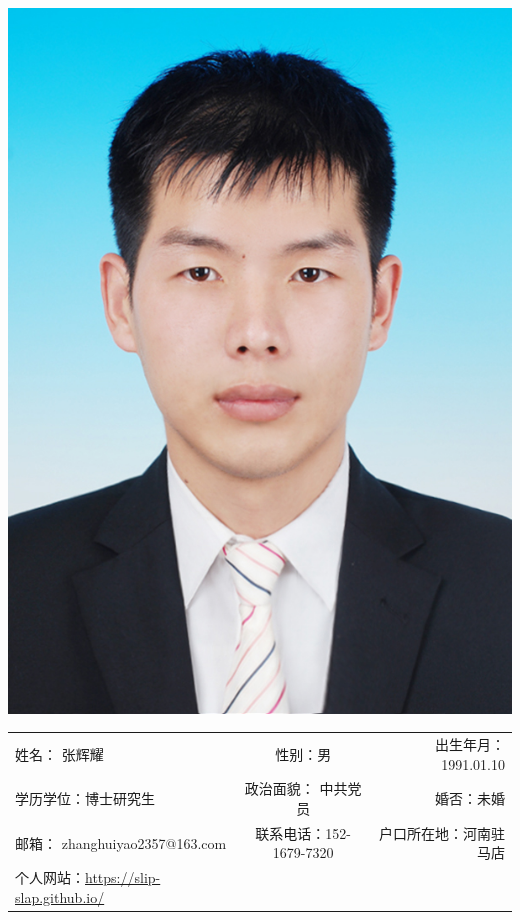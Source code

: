 
\begin{minipage}{0.2\textwidth}
	\includegraphics[scale=1.1]{8574.png}
\end{minipage}
\hfill
\begin{minipage}{0.8\textwidth}
	\renewcommand{\arraystretch}{2.2}
	\begin{adjustbox}{width=1\linewidth}
		\begin{tabular}{lcr}
			姓名： 张辉耀 & 性别：男 & 出生年月：1991.01.10 \\
			学历学位：博士研究生 & 政治面貌： 中共党员 & 婚否：未婚 \\
			邮箱： zhanghuiyao2357@163.com & 联系电话：152-1679-7320 &
			户口所在地：河南驻马店 \\
			个人网站：\url{https://slip-slap.github.io/} & &\\
		\end{tabular}
	\renewcommand{\arraystretch}{0.5}
	\end{adjustbox}
\end{minipage}
